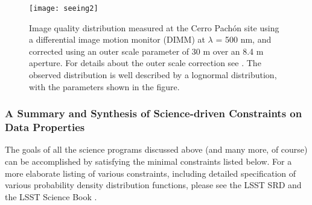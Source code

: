 
\begin{figure}
\texttt{[image: seeing2]}
\caption{
Image quality distribution measured at the Cerro Pach\'{o}n site using
a differential image motion monitor (DIMM) at $\lambda$ = 500 nm, and corrected
using an outer scale parameter of 30 m over an 8.4 m aperture. For details
about the outer scale correction see \citet{2002PASP..114.1156T}. The observed distribution
is well described by a lognormal distribution, with the parameters shown in
the figure.}
\label{Fig:seeing}
\end{figure}

\subsubsection{A Summary and Synthesis of Science-driven Constraints on Data Properties}

The goals of all the science programs discussed above
(and many more, of course) can be accomplished by satisfying the
minimal constraints listed below. For a more elaborate listing
of various constraints, including detailed specification of
various probability density distribution functions, please see the LSST SRD \citep{LPM-17}
and the LSST Science Book \citep{2009arXiv0912.0201L}.

